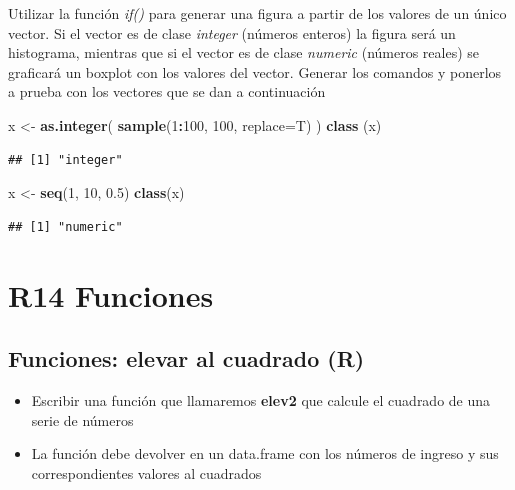 \documentclass[]{book}
\newenvironment{Shaded}{\begin{snugshade}}{\end{snugshade}}
\newcommand{\DataTypeTok}[1]{\textcolor[rgb]{0.13,0.29,0.53}{#1}}
\newcommand{\DecValTok}[1]{\textcolor[rgb]{0.00,0.00,0.81}{#1}}
\newcommand{\FloatTok}[1]{\textcolor[rgb]{0.00,0.00,0.81}{#1}}
\newcommand{\KeywordTok}[1]{\textcolor[rgb]{0.13,0.29,0.53}{\textbf{#1}}}
\newcommand{\NormalTok}[1]{#1}
\newcommand{\OperatorTok}[1]{\textcolor[rgb]{0.81,0.36,0.00}{\textbf{#1}}}
\newcommand{\StringTok}[1]{\textcolor[rgb]{0.31,0.60,0.02}{#1}}
\providecommand{\tightlist}{%
  \setlength{\itemsep}{0pt}\setlength{\parskip}{0pt}}
\begin{document}
Utilizar la función \emph{if()} para generar una figura a partir de los valores de un único vector. Si el vector es de clase \emph{integer} (números enteros) la figura será un histograma, mientras que si el vector es de clase \emph{numeric} (números reales) se graficará un boxplot con los valores del vector. Generar los comandos y ponerlos a prueba con los vectores que se dan a continuación

\begin{Shaded}
\begin{Highlighting}[]
\NormalTok{x <-}\StringTok{ }\KeywordTok{as.integer}\NormalTok{( }\KeywordTok{sample}\NormalTok{(}\DecValTok{1}\OperatorTok{:}\DecValTok{100}\NormalTok{, }\DecValTok{100}\NormalTok{, }\DataTypeTok{replace=}\NormalTok{T) )}
\KeywordTok{class}\NormalTok{ (x)}
\end{Highlighting}
\end{Shaded}

\begin{verbatim}
## [1] "integer"
\end{verbatim}

\begin{Shaded}
\begin{Highlighting}[]
\NormalTok{x <-}\StringTok{ }\KeywordTok{seq}\NormalTok{(}\DecValTok{1}\NormalTok{, }\DecValTok{10}\NormalTok{, }\FloatTok{0.5}\NormalTok{)}
\KeywordTok{class}\NormalTok{(x)}
\end{Highlighting}
\end{Shaded}

\begin{verbatim}
## [1] "numeric"
\end{verbatim}

\hypertarget{r14-funciones}{%
\chapter*{R14 Funciones}\label{r14-funciones}}

\hypertarget{funciones-elevar-al-cuadrado-r}{%
\section{Funciones: elevar al cuadrado (R)}\label{funciones-elevar-al-cuadrado-r}}

\begin{itemize}
\tightlist
\item
  Escribir una función que llamaremos \textbf{elev2} que calcule el cuadrado de una serie de números
\item
  La función debe devolver en un data.frame con los números de ingreso y sus correspondientes valores al cuadrados
\end{itemize}
\end{document}

